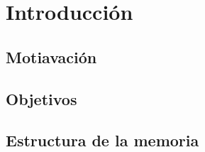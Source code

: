\chapter{Introducción}

\section{Motiavación}

\section{Objetivos}

\section{Estructura de la memoria}
